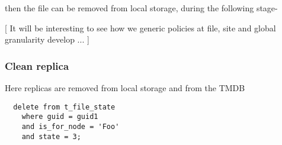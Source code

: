 \documentclass{cmspaper}
\begin{document}
then the file can be removed from local storage, during the following stage-

[ It will be interesting to see how we generic policies at file, site and global granularity develop ... ]

\subsubsection{Clean replica}
Here replicas are removed from local storage and from the TMDB

{\small\begin{verbatim}
  delete from t_file_state
    where guid = guid1
    and is_for_node = 'Foo'
    and state = 3;
\end{verbatim}}
\end{document}
